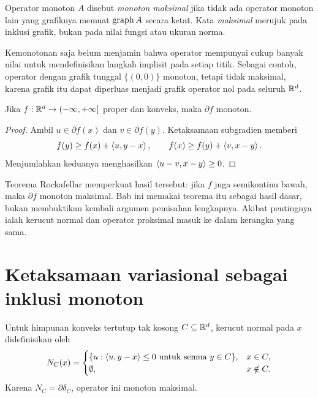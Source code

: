 \begin{defn}
  \label{orig02:def:maximal-monotone}
  Operator monoton $A$ disebut \emph{monoton maksimal} jika tidak ada operator
  monoton lain yang grafiknya memuat $\operatorname{\mathrm{graph}} A$ secara ketat. Kata
  \emph{maksimal} merujuk pada inklusi grafik, bukan pada nilai fungsi atau
  ukuran norma.
\end{defn}

Kemonotonan saja belum menjamin bahwa operator mempunyai cukup banyak nilai
untuk mendefinisikan langkah implisit pada setiap titik. Sebagai contoh,
operator dengan grafik tunggal $\{(0,0)\}$ monoton, tetapi tidak maksimal,
karena grafik itu dapat diperluas menjadi grafik operator nol pada seluruh
$\mathbb{R}^d$.

\begin{prop}
  \label{orig02:prop:subdiff-monotone}
  Jika $f:\mathbb{R}^d\to(-\infty,+\infty]$ proper dan konveks, maka $\partial f$
  monoton.
\end{prop}
\begin{proof}
  Ambil $u\in\partial f(x)$ dan $v\in\partial f(y)$. Ketaksamaan subgradien
  memberi
  \begin{equation}
    f(y)\geq f(x)+\left\langle u , y-x\right\rangle,
    \qquad
    f(x)\geq f(y)+\left\langle v , x-y\right\rangle.
  \end{equation}
  Menjumlahkan keduanya menghasilkan
  $\left\langle u-v , x-y\right\rangle\geq0$.
\end{proof}

Teorema Rockafellar memperkuat hasil tersebut: jika $f$ juga semikontinu
bawah, maka $\partial f$ monoton maksimal. Bab ini memakai teorema itu sebagai
hasil dasar, bukan membuktikan kembali argumen pemisahan lengkapnya. Akibat
pentingnya ialah kerucut normal dan operator proksimal masuk ke dalam kerangka
yang sama.

\section{Ketaksamaan variasional sebagai inklusi monoton}
\label{orig02:section:vi}

Untuk himpunan konveks tertutup tak kosong $C\subseteq\mathbb{R}^d$, kerucut normal
pada $x$ didefinisikan oleh
\begin{equation}
  \label{orig02:eq:normal-cone}
  N_C(x)=
  \begin{cases}
    \{u:\left\langle u , y-x\right\rangle\leq0\text{ untuk semua }y\in C\},&x\in C,\\
    \emptyset,&x\notin C.
  \end{cases}
\end{equation}
Karena $N_C=\partial\delta_C$, operator ini monoton maksimal.

